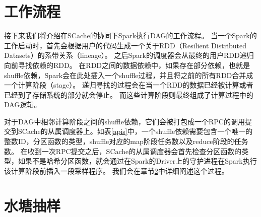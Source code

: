 \section{工作流程}

接下来我们将介绍在SCache的协同下Spark执行DAG的工作流程。
当一个Spark的工作启动时，首先会根据用户的代码生成一个关于RDD（Resilient Distributed Datasets）的系带关系（lineage）。
之后Spark的调度器会从最终的用户RDD递归向前寻找依赖的RDD。
在RDD之间的数据依赖中，如果存在部分依赖，也就是shuffle依赖，Spark会在此处插入一个shuffle过程，并且将之前的所有RDD合并成一个计算阶段（stage）。
递归寻找的过程会在当一个RDD的数据已经被计算或者已经到了存储系统的部分就会停止。
而这些计算阶段则最终组成了计算过程中的DAG逻辑。

对于DAG中相邻计算阶段之间的shuffle依赖，它们会被打包成一个RPC的调用提交到SCache的从属调度器上。如表\ref{apis}中，一个shuffle依赖需要包含一个唯一的整数ID，分区函数的类型，shuffle对应的map阶段任务数以及reduce阶段的任务数。
在收到一次RPC提交之后，SCache的从属调度器会首先检查分区函数的类型，如果不是哈希分区函数，就会通过在Spark的Driver上的守护进程在Spark执行该计算阶段前插入一段采样程序。
我们会在章节\ref{sec:sampling}中详细阐述这个过程。

\section{水塘抽样}
\label{sec:sampling}
